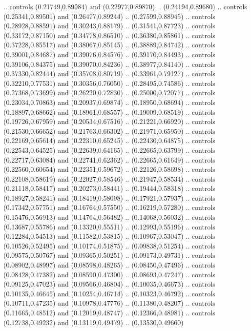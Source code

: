     .. controls (0.21749,0.89984) and (0.22977,0.89870) .. (0.24194,0.89680)
    .. controls (0.25341,0.89501) and (0.26477,0.89244) .. (0.27599,0.88945)
    .. controls (0.28928,0.88591) and (0.30243,0.88179) .. (0.31541,0.87723)
    .. controls (0.33172,0.87150) and (0.34778,0.86510) .. (0.36380,0.85861)
    .. controls (0.37228,0.85517) and (0.38067,0.85145) .. (0.38889,0.84742)
    .. controls (0.39001,0.84687) and (0.39076,0.84576) .. (0.39170,0.84493)
    .. controls (0.39106,0.84375) and (0.39070,0.84236) .. (0.38977,0.84140)
    .. controls (0.37330,0.82444) and (0.35708,0.80719) .. (0.33961,0.79127)
    .. controls (0.32210,0.77531) and (0.30356,0.76050) .. (0.28495,0.74586)
    .. controls (0.27368,0.73699) and (0.26220,0.72830) .. (0.25000,0.72077)
    .. controls (0.23034,0.70863) and (0.20937,0.69874) .. (0.18950,0.68694)
    .. controls (0.18897,0.68662) and (0.18961,0.68557) .. (0.19009,0.68519)
    .. controls (0.19726,0.67959) and (0.20534,0.67516) .. (0.21221,0.66920)
    .. controls (0.21530,0.66652) and (0.21763,0.66302) .. (0.21971,0.65950)
    .. controls (0.22169,0.65614) and (0.22310,0.65245) .. (0.22430,0.64875)
    .. controls (0.22543,0.64525) and (0.22639,0.64165) .. (0.22665,0.63799)
    .. controls (0.22717,0.63084) and (0.22741,0.62362) .. (0.22665,0.61649)
    .. controls (0.22560,0.60654) and (0.22351,0.59672) .. (0.22126,0.58698)
    .. controls (0.22108,0.58619) and (0.22027,0.58546) .. (0.21947,0.58534)
    .. controls (0.21118,0.58417) and (0.20273,0.58441) .. (0.19444,0.58318)
    .. controls (0.18927,0.58241) and (0.18419,0.58098) .. (0.17921,0.57937)
    .. controls (0.17342,0.57751) and (0.16764,0.57550) .. (0.16219,0.57280)
    .. controls (0.15476,0.56913) and (0.14764,0.56482) .. (0.14068,0.56032)
    .. controls (0.13687,0.55786) and (0.13320,0.55511) .. (0.12993,0.55196)
    .. controls (0.12284,0.54513) and (0.11582,0.53815) .. (0.10967,0.53047)
    .. controls (0.10526,0.52495) and (0.10174,0.51875) .. (0.09838,0.51254)
    .. controls (0.09575,0.50767) and (0.09365,0.50251) .. (0.09173,0.49731)
    .. controls (0.08902,0.48997) and (0.08598,0.48265) .. (0.08450,0.47496)
    .. controls (0.08428,0.47382) and (0.08590,0.47300) .. (0.08693,0.47247)
    .. controls (0.09125,0.47023) and (0.09566,0.46804) .. (0.10035,0.46673)
    .. controls (0.10135,0.46645) and (0.10254,0.46714) .. (0.10323,0.46792)
    .. controls (0.10711,0.47235) and (0.10978,0.47776) .. (0.11380,0.48207)
    .. controls (0.11665,0.48512) and (0.12019,0.48747) .. (0.12366,0.48981)
    .. controls (0.12738,0.49232) and (0.13119,0.49479) .. (0.13530,0.49660)
